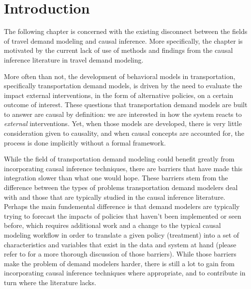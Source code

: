\section{Introduction}
\label{sec:intro}

The following chapter is concerned with the existing disconnect between the 
fields of travel demand modeling and causal inference. 
More specifically, the chapter is motivated by the current lack of use of methods and findings from 
the causal inference literature in travel demand modeling. 

More often than not, the development of behavioral models in transportation, 
specifically transportation demand models, is driven by the need to evaluate 
the impact external interventions, in the form of alternative policies, on a 
certain outcome of interest. 
These questions that transportation demand models 
are built to answer are causal by definition: we are interested in how the 
system reacts to \textit{external} interventions. 
Yet, when those models are 
developed, there is very little consideration given to causality, and when 
causal concepts are accounted for, the process is done implicitly without a 
formal framework. 

While the field of transportation demand modeling could benefit greatly from 
incorporating causal inference techniques, there are barriers that have made 
this integration slower than what one would hope. 
These barriers stem from the difference between the types of problems transportation demand modelers deal with and those that are typically studied in the causal inference literature. 
Perhaps the main fundemental difference is that demand modelers 
are typically trying to forecast the impacts of policies that haven't been 
implemented or seen before, which requires additional work and a change to the
typical causal modeling workflow in order to translate a given policy 
(treatment) into a set of characteristics and variables that exist in the
data and system at hand (please refer to \citet{brathwaite_2018_causal} for a 
more thorough discussion of those barriers). 
While those barriers make the problem of demand modelers harder, there is still a lot to gain from 
incorporating causal inference techniques where appropriate, and to contribute
in turn where the literature lacks.  

